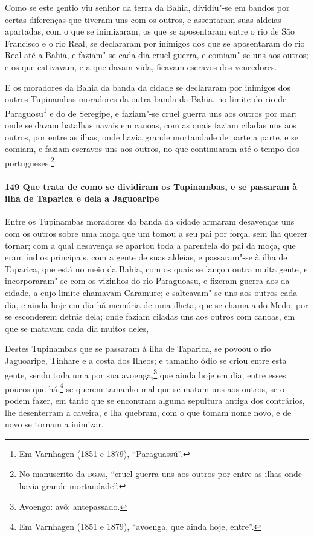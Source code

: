 Como se este gentio viu senhor da terra da Bahia, dividiu"-se em bandos por certas
diferenças que tiveram uns com os outros, e assentaram suas aldeias apartadas, com o que
se inimizaram; os que se aposentaram entre o rio de São Francisco e o rio Real, se
declararam por inimigos dos que se aposentaram do rio Real até a Bahia, e faziam"-se cada
dia cruel guerra, e comiam"-se uns aos outros; e os que cativavam, e a que davam vida,
ficavam escravos dos vencedores.

E os moradores da Bahia da banda da cidade se declararam por inimigos dos outros
Tupinambas moradores da outra banda da Bahia, no limite do rio de Paraguosu\footnote{ Em
Varnhagen (1851 e 1879), ``Paraguassú''.} e do de Seregipe, e faziam"-se cruel guerra uns
aos outros por mar; onde se davam batalhas navais em canoas, com as quais faziam ciladas
uns aos outros, por entre as ilhas, onde havia grande mortandade de parte a parte, e se
comiam, e faziam escravos uns aos outros, no que continuaram até o tempo dos
portugueses.\footnote{ No manuscrito da \textsc{bgjm}, ``cruel guerra uns aos outros por
entre as ilhas onde havia grande mortandade''.}

\paragraph{149 Que trata de como se dividiram os Tupinambas, e se passaram à ilha de
Taparica e dela a Jaguoaripe}

Entre os Tupinambas moradores da banda da cidade armaram desavenças uns com os outros
sobre uma moça que um tomou a seu pai por força, sem lha querer tornar; com a qual
desavença se apartou toda a parentela do pai da moça, que eram índios principais, com a
gente de suas aldeias, e passaram"-se à ilha de Taparica, que está no meio da Bahia, com os
quais se lançou outra muita gente, e incorporaram"-se com os vizinhos do rio Paraguoasu, e
fizeram guerra aos da cidade, a cujo limite chamavam Caramure; e salteavam"-se uns aos
outros cada dia, e ainda hoje em dia há memória de uma ilheta, que se chama a do Medo, por
se esconderem detrás dela; onde faziam ciladas uns aos outros com canoas, em que se
matavam cada dia muitos deles,

Destes Tupinambas que se passaram à ilha de Taparica, se povoou o rio Jaguoaripe, Tinhare
e a costa dos Ilheos; e tamanho ódio se criou entre esta gente, sendo toda uma por sua
avoenga,\footnote{ Avoengo: avô; antepassado.} que ainda hoje em dia, entre esses poucos
que há,\footnote{ Em Varnhagen (1851 e 1879), ``avoenga, que ainda hoje, entre''.} se
querem tamanho mal que se matam uns aos outros, se o podem fazer, em tanto que se
encontram alguma sepultura antiga dos contrários, lhe desenterram a caveira, e lha
quebram, com o que tomam nome novo, e de novo se tornam a inimizar.

